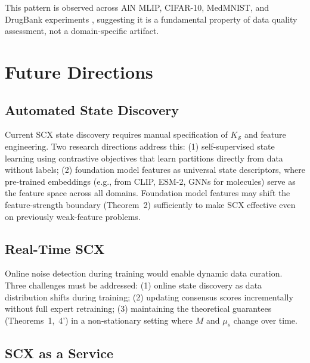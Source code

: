 \documentclass[twocolumn]{article}
\theoremstyle{definition}
\begin{document}
This pattern is observed across AlN MLIP, CIFAR-10, MedMNIST, and DrugBank experiments \cite{paperII, paperIII}, suggesting it is a fundamental property of data quality assessment, not a domain-specific artifact.

\section{Future Directions}

\subsection{Automated State Discovery}

Current SCX state discovery requires manual specification of $K_{\mathcal{S}}$ and feature engineering. Two research directions address this: (1) self-supervised state learning using contrastive objectives that learn partitions directly from data without labels; (2) foundation model features as universal state descriptors, where pre-trained embeddings (e.g., from CLIP, ESM-2, GNNs for molecules) serve as the feature space across all domains. Foundation model features may shift the feature-strength boundary (Theorem~2) sufficiently to make SCX effective even on previously weak-feature problems.

\subsection{Real-Time SCX}

Online noise detection during training would enable dynamic data curation. Three challenges must be addressed: (1) online state discovery as data distribution shifts during training; (2) updating consensus scores incrementally without full expert retraining; (3) maintaining the theoretical guarantees (Theorems~1,~4') in a non-stationary setting where $M$ and $\mu_s$ change over time.

\subsection{SCX as a Service}
\end{document}
